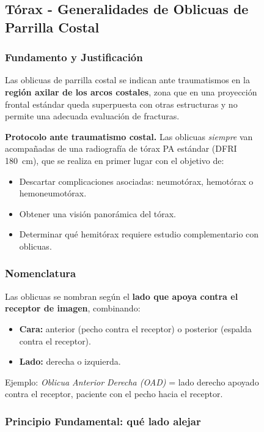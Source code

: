 \begin{figure}
{\subsection{Tórax - Generalidades de Oblicuas de Parrilla Costal}

\subsubsection*{Fundamento y Justificación}

Las oblicuas de parrilla costal se indican ante traumatismos en la \textbf{región axilar de los arcos costales}, zona que en una proyección frontal estándar queda superpuesta con otras estructuras y no permite una adecuada evaluación de fracturas.

\medskip

\noindent
\textbf{Protocolo ante traumatismo costal.} Las oblicuas \emph{siempre} van acompañadas de una radiografía de tórax PA estándar (DFRI 180~cm), que se realiza en primer lugar con el objetivo de:

\begin{itemize}
  \item Descartar complicaciones asociadas: neumotórax, hemotórax o hemoneumotórax.
  \item Obtener una visión panorámica del tórax.
  \item Determinar qué hemitórax requiere estudio complementario con oblicuas.
\end{itemize}

\subsubsection*{Nomenclatura}

Las oblicuas se nombran según el \textbf{lado que apoya contra el receptor de imagen}, combinando:

\begin{itemize}
  \item \textbf{Cara:} anterior (pecho contra el receptor) o posterior (espalda contra el receptor).
  \item \textbf{Lado:} derecha o izquierda.
\end{itemize}

\noindent
Ejemplo: \textit{Oblicua Anterior Derecha (OAD)} = lado derecho apoyado contra el receptor, paciente con el pecho hacia el receptor.

\subsubsection*{Principio Fundamental: qué lado alejar}

}
\end{figure}
